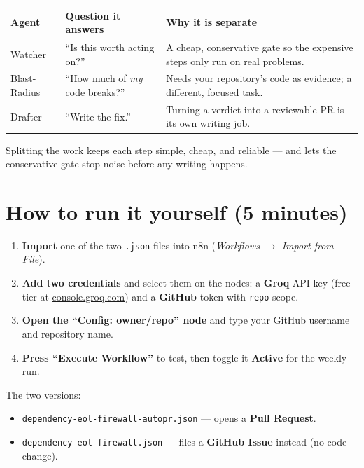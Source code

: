 \documentclass[11pt,a4paper]{article}
\begin{document}
\begin{center}
\begin{tabular}{@{}p{3.1cm}p{4.2cm}p{6.4cm}@{}}
\toprule
\textbf{Agent} & \textbf{Question it answers} & \textbf{Why it is separate} \\
\midrule
Watcher & ``Is this worth acting on?'' & A cheap, conservative gate so the expensive steps only run on
 real problems. \\
Blast-Radius & ``How much of \emph{my} code breaks?'' & Needs your repository's code as evidence; a
 different, focused task. \\
Drafter & ``Write the fix.'' & Turning a verdict into a reviewable PR is its own writing job. \\
\bottomrule
\end{tabular}
\end{center}

\noindent Splitting the work keeps each step simple, cheap, and reliable --- and lets the conservative
gate stop noise before any writing happens.

\section{How to run it yourself (5 minutes)}

\begin{enumerate}[leftmargin=1.5em]
  \item \textbf{Import} one of the two \texttt{.json} files into n8n
    (\emph{Workflows $\rightarrow$ Import from File}).
  \item \textbf{Add two credentials} and select them on the nodes: a \textbf{Groq} API key (free tier at
    \href{https://console.groq.com}{console.groq.com}) and a \textbf{GitHub} token with \texttt{repo}
    scope.
  \item \textbf{Open the ``Config: owner/repo'' node} and type your GitHub username and repository name.
  \item \textbf{Press ``Execute Workflow''} to test, then toggle it \textbf{Active} for the weekly run.
\end{enumerate}

\noindent The two versions:
\begin{itemize}[leftmargin=1.4em]
  \item \texttt{dependency-eol-firewall-autopr.json} --- opens a \textbf{Pull Request}.
  \item \texttt{dependency-eol-firewall.json} --- files a \textbf{GitHub Issue} instead (no code change).
\end{itemize}
\end{document}
